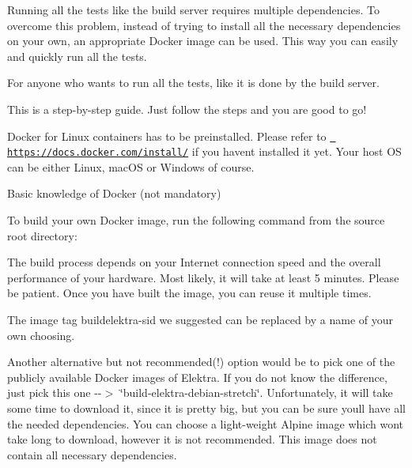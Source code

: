 Running all the tests like the build server requires multiple dependencies. To overcome this problem, instead of trying to install all the necessary dependencies on your own, an appropriate Docker image can be used. This way you can easily and quickly run all the tests.

For anyone who wants to run all the tests, like it is done by the build server.

This is a step-\/by-\/step guide. Just follow the steps and you are good to go!


\begin{DoxyItemize}
\item Docker for Linux containers has to be preinstalled. Please refer to \href{https://docs.docker.com/install/}{\texttt{ https\+://docs.\+docker.\+com/install/}} if you haven\textquotesingle{}t installed it yet. Your host OS can be either Linux, mac\+OS or Windows of course.
\item Basic knowledge of Docker (not mandatory)
\end{DoxyItemize}

To build your own Docker image, run the following command from the source root directory\+:


\begin{DoxyCode}{0}
\end{DoxyCode}


The build process depends on your Internet connection speed and the overall performance of your hardware. Most likely, it will take at least 5 minutes. Please be patient. Once you have built the image, you can reuse it multiple times.

The image tag {\ttfamily buildelektra-\/sid} we suggested can be replaced by a name of your own choosing.

Another alternative but not recommended(!) option would be to pick one of the publicly available Docker images of Elektra. If you do not know the difference, just pick this one -\/-\/$>$ \char`\"{}build-\/elektra-\/debian-\/stretch\char`\"{}. Unfortunately, it will take some time to download it, since it is pretty big, but you can be sure you\textquotesingle{}ll have all the needed dependencies. You can choose a light-\/weight Alpine image which won\textquotesingle{}t take long to download, however it is not recommended. This image does not contain all necessary dependencies.

